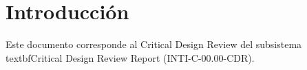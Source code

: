 \section{Introducción}
Este documento corresponde al Critical Design Review del subsistema \\textbf{Critical Design Review Report} (INTI-C-00.00-CDR).
